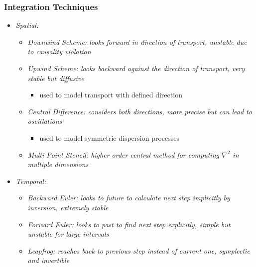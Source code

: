 	\begin{frame}
		\frametitle{Integration Techniques}
		\begin{itemize}
			\item<2-> \itshape{Spatial:}
			\begin{itemize}
				\item<3-> \itshape{Downwind Scheme:} looks forward in direction of transport, unstable due to causality violation
				\item<4-> \itshape{Upwind Scheme:} looks backward against the direction of transport, very stable but diffusive
				\begin{itemize}
					\item<5-> used to model transport with defined direction
				\end{itemize}
				\item<6-> \itshape{Central Difference:} considers both directions, more precise but can lead to oscillations
				\begin{itemize}
					\item<7-> used to model symmetric dispersion processes
				\end{itemize}
				\item<8-> \itshape{Multi Point Stencil:} higher order central method for computing $\nabla^2$ in multiple dimensions
			\end{itemize}
			\item<9-> \itshape{Temporal:}
			\begin{itemize}
				\item<10-> \itshape{Backward Euler:} looks to future to calculate next step implicitly by inversion, extremely stable
				\item<11-> \itshape{Forward Euler:} looks to past to find next step explicitly, simple but unstable for large intervals
				\item<12-> \itshape{Leapfrog:} reaches back to previous step instead of current one, symplectic and invertible
			\end{itemize}
		\end{itemize}
	\end{frame}

